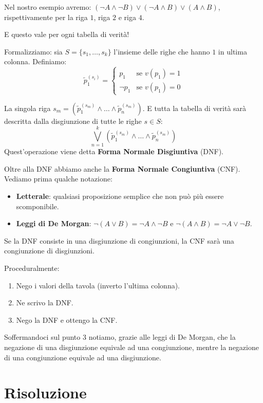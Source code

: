 \documentclass[12pt]{report}
\begin{document}
	Nel nostro esempio avremo: $(\neg A \land \neg B) \lor (\neg A \land B) \lor (A \land B)$, rispettivamente per la riga $1$, riga $2$ e riga $4$.
	
	E questo vale per ogni tabella di verità!
	
	Formalizziamo: sia $S = \{s_1, \dots, s_k\}$ l'insieme delle righe che hanno $1$ in ultima colonna.
	Definiamo:
	\[
	\tilde{p}_1^{(s_i)} = \begin{cases}
		p_1 & \text{se } v(p_1) = 1 \\
		\neg p_1 & \text{se } v(p_1) = 0
	\end{cases}
	\]
	
	La singola riga $s_m = (\tilde{p}_1^{(s_m)} \land \dots \land \tilde{p}_n^{(s_m)})$.
	E tutta la tabella di verità sarà descritta dalla disgiunzione di tutte le righe $s \in S$:
	\[
	\bigvee_{n=1}^{k} (\tilde{p}_1^{(s_m)} \land \dots \land \tilde{p}_n^{(s_m)})
	\]
	Quest'operazione viene detta \textbf{Forma Normale Disgiuntiva} (DNF).
	
	Oltre alla DNF abbiamo anche la \textbf{Forma Normale Congiuntiva} (CNF). Vediamo prima qualche notazione:
	\begin{itemize}
		\item \textbf{Letterale}: qualsiasi proposizione semplice che non può più essere scomponibile.
		\item \textbf{Leggi di De Morgan}: 
		$\neg (A \lor B) = \neg A \land \neg B$ e $\neg (A \land B) = \neg A \lor \neg B$.
	\end{itemize}
	
	Se la DNF consiste in una disgiunzione di congiunzioni, la CNF sarà una congiunzione di disgiunzioni.
	
	Proceduralmente:
	\begin{enumerate}
		\item Nego i valori della tavola (inverto l'ultima colonna).
		\item Ne scrivo la DNF.
		\item Nego la DNF e ottengo la CNF.
	\end{enumerate}
	
	Soffermandoci sul punto 3 notiamo, grazie alle leggi di De Morgan, che la negazione di una disgiunzione equivale ad una congiunzione, mentre la negazione di una congiunzione equivale ad una disgiunzione.
	
	\chapter{Risoluzione}
	
\end{document}
